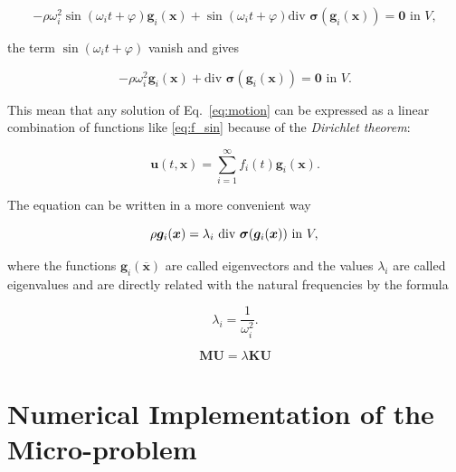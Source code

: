 \documentclass[3p]{elsarticle}
\begin{document}
\begin{equation}
- \rho \omega_i^2 \sin (\omega_i t + \varphi) \bm{g}_i(\bm{x}) +
\sin (\omega_i t + \varphi) \text{div } \bm{\sigma}(\bm{g}_i(\bm{x})) 
= \bm{0} \text{ in } V,
\label{eq:motion}
\end{equation}

\noindent
the term $\sin (\omega_i t + \varphi)$ vanish and gives

\begin{equation}
- \rho \omega_i^2 \bm{g}_i(\bm{x}) +
\text{div } \bm{\sigma}(\bm{g}_i(\bm{x})) 
= \bm{0} \text{ in } V.
\label{eq:motion}
\end{equation}

This mean that any solution of Eq.~\ref{eq:motion} can be expressed as a linear
combination of functions like \ref{eq:f_sin} because of the \emph{Dirichlet
theorem}:

\begin{equation}
\bm{u}(t,\bm{x}) = \sum_{i=1}^{\infty} f_i(t)
\bm{g}_i(\bm{x}).
\label{eq:dir_teo}
\end{equation}

The equation can be written in a more convenient way

\begin{equation}
\rho \bm{g}_i(\bm{x}) = 
\lambda_i  \text{ div } \bm{\sigma}(\bm{g}_i(\bm{x})) 
\text{ in } V,\\
\label{eq:motion}
\end{equation}

\noindent
where the functions $\bm{g}_i(\overline{\bm{x}})$ are called eigenvectors and the
values $\lambda_i$ are called eigenvalues and are directly related with the
natural frequencies by the formula

\begin{equation}
\lambda_i = \frac{1}{\omega_i^2}.
\label{eq:motion}
\end{equation}

\begin{equation}
\bm{M}\bm{U} = \lambda \bm{K}\bm{U}
\label{eq:equil_matricial}
\end{equation}


\section{Numerical Implementation of the Micro-problem}
\end{document}
